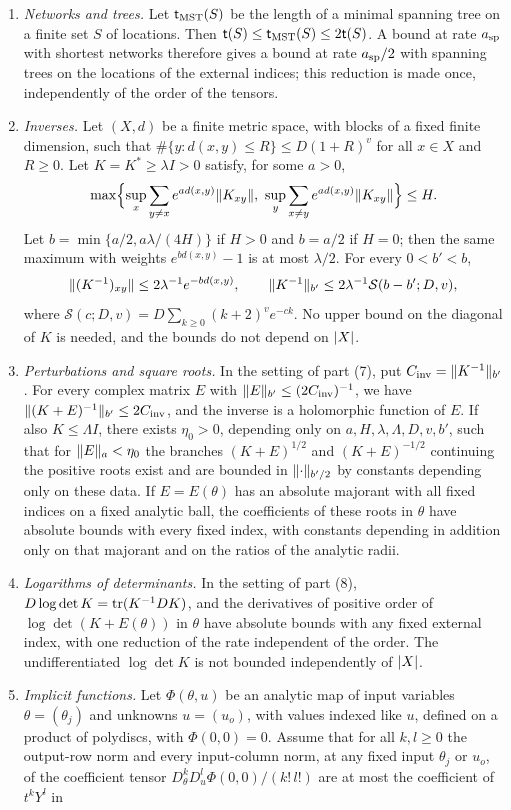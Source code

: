\begin{lemma}
\begin{enumerate}
\item \emph{Networks and trees.} Let $\mathsf t_{\mathrm{MST}}(S)$ be the length of a minimal spanning tree on a finite set $S$ of locations. Then $\mathsf t(S)\le\mathsf t_{\mathrm{MST}}(S)\le2\mathsf t(S)$. A bound at rate $a_{\mathrm{sp}}$ with shortest networks therefore gives a bound at rate $a_{\mathrm{sp}}/2$ with spanning trees on the locations of the external indices; this reduction is made once, independently of the order of the tensors.
\item \emph{Inverses.} Let $(X,d)$ be a finite metric space, with blocks of a fixed finite dimension, such that $\#\{y:d(x,y)\le R\}\le D(1+R)^v$ for all $x\in X$ and $R\ge0$. Let $K=K^*\ge\lambda I>0$ satisfy, for some $a>0$,
\[
 \max\Bigl\{\sup_x\sum_{y\ne x}e^{ad(x,y)}\lVert K_{xy}\rVert,\ \sup_y\sum_{x\ne y}e^{ad(x,y)}\lVert K_{xy}\rVert\Bigr\}\le H.
\]
Let $b=\min\{a/2,a\lambda/(4H)\}$ if $H>0$ and $b=a/2$ if $H=0$; then the same maximum with weights $e^{bd(x,y)}-1$ is at most $\lambda/2$. For every $0<b'<b$,
\[
 \lVert (K^{-1})_{xy}\rVert\le2\lambda^{-1}e^{-bd(x,y)},\qquad
 \lVert K^{-1}\rVert_{b'}\le2\lambda^{-1}\mathcal S(b-b';D,v),
\]
where $\mathcal S(c;D,v)=D\sum_{k\ge0}(k+2)^ve^{-ck}$. No upper bound on the diagonal of $K$ is needed, and the bounds do not depend on $\lvert X\rvert$.
\item \emph{Perturbations and square roots.} In the setting of part (7), put $C_{\mathrm{inv}}=\lVert K^{-1}\rVert_{b'}$. For every complex matrix $E$ with $\lVert E\rVert_{b'}\le(2C_{\mathrm{inv}})^{-1}$, we have $\lVert (K+E)^{-1}\rVert_{b'}\le2C_{\mathrm{inv}}$, and the inverse is a holomorphic function of $E$. If also $K\le\Lambda I$, there exists $\eta_0>0$, depending only on $a,H,\lambda,\Lambda,D,v,b'$, such that for $\lVert E\rVert_a<\eta_0$ the branches $(K+E)^{1/2}$ and $(K+E)^{-1/2}$ continuing the positive roots exist and are bounded in $\lVert \cdot\rVert_{b'/2}$ by constants depending only on these data. If $E=E(\theta)$ has an absolute majorant with all fixed indices on a fixed analytic ball, the coefficients of these roots in $\theta$ have absolute bounds with every fixed index, with constants depending in addition only on that majorant and on the ratios of the analytic radii.
\item \emph{Logarithms of determinants.} In the setting of part (8), $D\log\det K=\operatorname{tr}(K^{-1}DK)$, and the derivatives of positive order of $\log\det(K+E(\theta))$ in $\theta$ have absolute bounds with any fixed external index, with one reduction of the rate independent of the order. The undifferentiated $\log\det K$ is not bounded independently of $\lvert X\rvert$.
\item \emph{Implicit functions.} Let $\Phi(\theta,u)$ be an analytic map of input variables $\theta=(\theta_j)$ and unknowns $u=(u_o)$, with values indexed like $u$, defined on a product of polydiscs, with $\Phi(0,0)=0$. Assume that for all $k,l\ge0$ the output-row norm and every input-column norm, at any fixed input $\theta_j$ or $u_o$, of the coefficient tensor $D^k_\theta D^l_u\Phi(0,0)/(k!\,l!)$ are at most the coefficient of $t^kY^l$ in

\end{enumerate}
\end{lemma}
